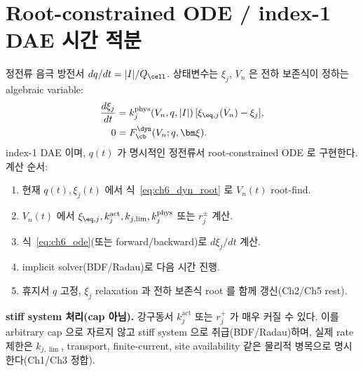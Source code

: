 \section{Root-constrained ODE / index-1 DAE 시간 적분}\label{sec:ch6_dae}
정전류 음극 방전서 $dq/dt=|I|/Q_\cell$. 상태변수는 $\xi_j$, $V_n$ 은 전하 보존식이 정하는 algebraic
variable:
\begin{align}
\frac{d\xi_j}{dt}&=k_j^{\mathrm{phys}}(V_n,q,|I|)\,[\xi_{\eq,j}(V_n)-\xi_j],\label{eq:ch6_ode}\\
0&=F_{\cb}^{\dyn}(V_n;q,\bm\xi).\label{eq:ch6_alg}
\end{align}
index-1 DAE 이며, $q(t)$ 가 명시적인 정전류서 root-constrained ODE 로 구현한다. 계산 순서:
\begin{enumerate}[label=T\arabic*),leftmargin=2.2em]
\item 현재 $q(t),\xi_j(t)$ 에서 식~\eqref{eq:ch6_dyn_root} 로 $V_n(t)$ root-find.
\item $V_n(t)$ 에서 $\xi_{\eq,j},k_j^{\mathrm{act}},k_{j,\lim},k_j^{\mathrm{phys}}$ 또는 $r_j^\pm$ 계산.
\item 식~\eqref{eq:ch6_ode}(또는 forward/backward)로 $d\xi_j/dt$ 계산.
\item implicit solver(BDF/Radau)로 다음 시간 진행.
\item 휴지서 $q$ 고정, $\xi_j$ relaxation 과 전하 보존식 root 를 함께 갱신(Ch2/Ch5 rest).
\end{enumerate}
\begin{boundbox}
\textbf{stiff system 처리(cap 아님).} 강구동서 $k_j^{\mathrm{act}}$ 또는 $r_j^+$ 가 매우 커질 수 있다. 이를
arbitrary cap 으로 자르지 않고 stiff system 으로 취급(BDF/Radau)하며, 실제 rate 제한은 $k_{j,\lim}$,
transport, finite-current, site availability 같은 물리적 병목으로 명시한다(Ch1/Ch3 정합).
\end{boundbox}

